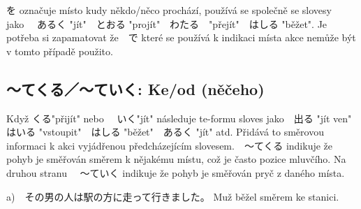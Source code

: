 を označuje místo kudy někdo/něco prochází, používá se společně se slovesy　jako 　あるく "jít"　とおる "projít"　わたる　"přejít"　はしる "běžet". Je potřeba si zapamatovat že　で které se používá k indikaci místa akce nemůže být v tomto případě použito.

\subsection{〜てくる／〜ていく: Ke/od (něčeho)}
Když くる"přijít" nebo 　いく"jít" následuje te-formu sloves jako　出る "jít ven"　はいる "vstoupit"　はしる "běžet"　あるく "jít" atd. Přidává to směrovou informaci k akci vyjádřenou předcházejícím slovesem.　〜てくる indikuje že pohyb je směřován směrem k nějakému místu, což je často pozice mluvčího. Na druhou stranu 　〜ていく indikuje že pohyb je směřován pryč z daného místa. 

a)　その男の人は駅の方に走って行きました。 Muž běžel směrem ke stanici.


